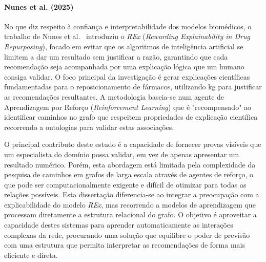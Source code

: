 \paragraph{Nunes et al. (2025)}
No que diz respeito à confiança e interpretabilidade dos modelos biomédicos, o trabalho de Nunes et al.~\cite{nunes2025} introduziu o \emph{REx} (\emph{Rewarding Explainability in Drug Repurposing}), focado em evitar que os algoritmos de inteligência artificial se limitem a dar um resultado sem justificar a razão, garantindo que cada recomendação seja acompanhada por uma explicação lógica que um humano consiga validar. O foco principal da investigação é gerar explicações científicas fundamentadas para o reposicionamento de fármacos, utilizando \acrshort{kg} para justificar as recomendações resultantes. A metodologia baseia-se num agente de Aprendizagem por Reforço (\emph{Reinforcement Learning}) que é "recompensado" ao identificar caminhos no grafo que respeitem propriedades de explicação científica recorrendo a ontologias para validar estas associações.

O principal contributo deste estudo é a capacidade de fornecer provas visíveis que um especialista do domínio possa validar, em vez de apenas apresentar um resultado numérico. Porém, esta abordagem está limitada pela complexidade da pesquisa de caminhos em grafos de larga escala através de agentes de reforço, o que pode ser computacionalmente exigente e difícil de otimizar para todas as relações possíveis. Esta dissertação diferencia-se ao integrar a preocupação com a explicabilidade do modelo \emph{REx}, mas recorrendo a modelos de aprendizagem que processam diretamente a estrutura relacional do grafo. O objetivo é aproveitar a capacidade destes sistemas para aprender automaticamente as interações complexas da rede, procurando uma solução que equilibre o poder de previsão com uma estrutura que permita interpretar as recomendações de forma mais eficiente e direta.

